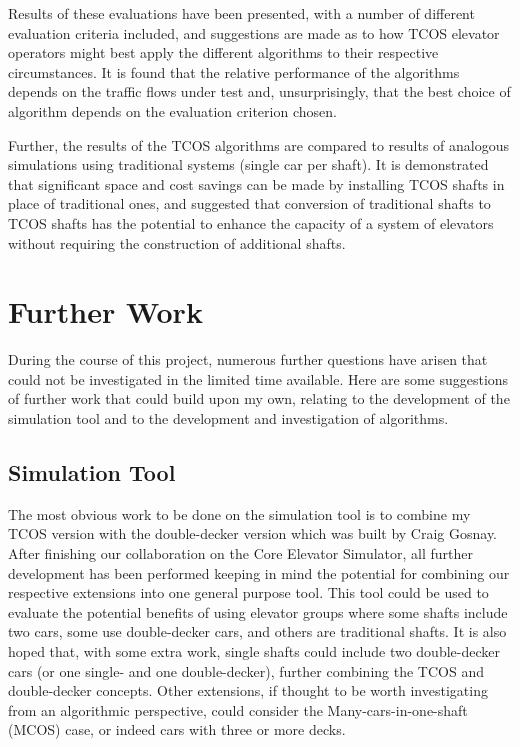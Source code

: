 \documentclass{UoYCSproject}
\begin{document}
Results of these evaluations have been presented, with a number of different evaluation criteria included, and suggestions are made as to how TCOS elevator operators might best apply the different algorithms to their respective circumstances.  It is found that the relative performance of the algorithms depends on the traffic flows under test and, unsurprisingly, that the best choice of algorithm depends on the evaluation criterion chosen.

Further, the results of the TCOS algorithms are compared to results of analogous simulations using traditional systems (single car per shaft).  It is demonstrated that significant space and cost savings can be made by installing TCOS shafts in place of traditional ones, and suggested that conversion of traditional shafts to TCOS shafts has the potential to enhance the capacity of a system of elevators without requiring the construction of additional shafts.

\section{Further Work}

During the course of this project, numerous further questions have arisen that could not be investigated in the limited time available.  Here are some suggestions of further work that could build upon my own, relating to the development of the simulation tool and to the development and investigation of algorithms.

\subsection{Simulation Tool}

The most obvious work to be done on the simulation tool is to combine my TCOS version with the double-decker version which was built by Craig Gosnay.  After finishing our collaboration on the Core Elevator Simulator, all further development has been performed keeping in mind the potential for combining our respective extensions into one general purpose tool.  This tool could be used to evaluate the potential benefits of using elevator groups where some shafts include two cars, some use double-decker cars, and others are traditional shafts.  It is also hoped that, with some extra work, single shafts could include two double-decker cars (or one single- and one double-decker), further combining the TCOS and double-decker concepts.  Other extensions, if thought to be worth investigating from an algorithmic perspective, could consider the Many-cars-in-one-shaft (MCOS) case, or indeed cars with three or more decks.
\end{document}
